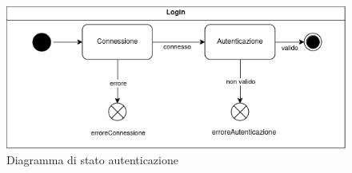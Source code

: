 \documentclass[a4paper, 11pt,oneside]{book}
\begin{document}
        \begin{figure}[H]
            \centering
            \includegraphics[scale=0.55]{diagramma di stato_autenticazione.png}
            \caption{Diagramma di stato autenticazione}
            \label{fig:diagramma_stati_autenticazione}
        \end{figure}
\end{document}
